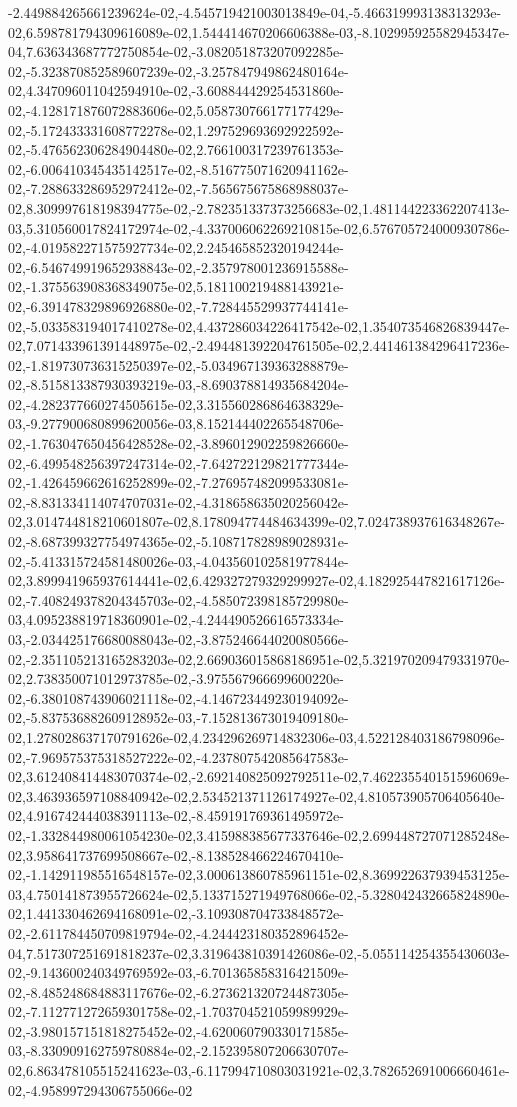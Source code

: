 -2.449884265661239624e-02,-4.545719421003013849e-04,-5.466319993138313293e-02,6.598781794309616089e-02,1.544414670206606388e-03,-8.102995925582945347e-04,7.636343687772750854e-02,-3.082051873207092285e-02,-5.323870852589607239e-02,-3.257847949862480164e-02,4.347096011042594910e-02,-3.608844429254531860e-02,-4.128171876072883606e-02,5.058730766177177429e-02,-5.172433331608772278e-02,1.297529693692922592e-02,-5.476562306284904480e-02,2.766100317239761353e-02,-6.006410345435142517e-02,-8.516775071620941162e-02,-7.288633286952972412e-02,-7.565675675868988037e-02,8.309997618198394775e-02,-2.782351337373256683e-02,1.481144223362207413e-03,5.310560017824172974e-02,-4.337006062269210815e-02,6.576705724000930786e-02,-4.019582271575927734e-02,2.245465852320194244e-02,-6.546749919652938843e-02,-2.357978001236915588e-02,-1.375563908368349075e-02,5.181100219488143921e-02,-6.391478329896926880e-02,-7.728445529937744141e-02,-5.033583194017410278e-02,4.437286034226417542e-02,1.354073546826839447e-02,7.071433961391448975e-02,-2.494481392204761505e-02,2.441461384296417236e-02,-1.819730736315250397e-02,-5.034967139363288879e-02,-8.515813387930393219e-03,-8.690378814935684204e-02,-4.282377660274505615e-02,3.315560286864638329e-03,-9.277900680899620056e-03,8.152144402265548706e-02,-1.763047650456428528e-02,-3.896012902259826660e-02,-6.499548256397247314e-02,-7.642722129821777344e-02,-1.426459662616252899e-02,-7.276957482099533081e-02,-8.831334114074707031e-02,-4.318658635020256042e-02,3.014744818210601807e-02,8.178094774484634399e-02,7.024738937616348267e-02,-8.687399327754974365e-02,-5.108717828989028931e-02,-5.413315724581480026e-03,-4.043560102581977844e-02,3.899941965937614441e-02,6.429327279329299927e-02,4.182925447821617126e-02,-7.408249378204345703e-02,-4.585072398185729980e-03,4.095238819718360901e-02,-4.244490526616573334e-03,-2.034425176680088043e-02,-3.875246644020080566e-02,-2.351105213165283203e-02,2.669036015868186951e-02,5.321970209479331970e-02,2.738350071012973785e-02,-3.975567966699600220e-02,-6.380108743906021118e-02,-4.146723449230194092e-02,-5.837536882609128952e-03,-7.152813673019409180e-02,1.278028637170791626e-02,4.234296269714832306e-03,4.522128403186798096e-02,-7.969575375318527222e-02,-4.237807542085647583e-02,3.612408414483070374e-02,-2.692140825092792511e-02,7.462235540151596069e-02,3.463936597108840942e-02,2.534521371126174927e-02,4.810573905706405640e-02,4.916742444038391113e-02,-8.459191769361495972e-02,-1.332844980061054230e-02,3.415988385677337646e-02,2.699448727071285248e-02,3.958641737699508667e-02,-8.138528466224670410e-02,-1.142911985516548157e-02,3.000613860785961151e-02,8.369922637939453125e-03,4.750141873955726624e-02,5.133715271949768066e-02,-5.328042432665824890e-02,1.441330462694168091e-02,-3.109308704733848572e-02,-2.611784450709819794e-02,-4.244423180352896452e-04,7.517307251691818237e-02,3.319643810391426086e-02,-5.055114254355430603e-02,-9.143600240349769592e-03,-6.701365858316421509e-02,-8.485248684883117676e-02,-6.273621320724487305e-02,-7.112771272659301758e-02,-1.703704521059989929e-02,-3.980157151818275452e-02,-4.620060790330171585e-03,-8.330909162759780884e-02,-2.152395807206630707e-02,6.863478105515241623e-03,-6.117994710803031921e-02,3.782652691006660461e-02,-4.958997294306755066e-02
